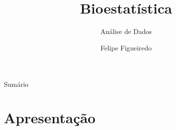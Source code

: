 \documentclass{beamer}
\title%
{Bioestatística}
\subtitle
{Análise de Dados} %
\author%
{Felipe Figueiredo}%
\institute[INTO] %
{Instituto Nacional de Traumatologia e Ortopedia
}
\date%
{}
\begin{document}
\begin{frame}
  \titlepage
\end{frame}

\begin{frame}{Sumário}
  \tableofcontents
\end{frame}









\section{Apresentação}
\end{document}
